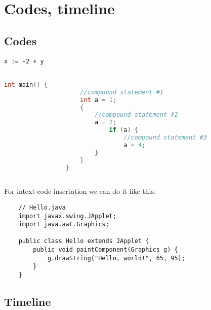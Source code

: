 \chapter{Codes, timeline} \label{chap-4}

\section{Codes}

\begin{lstlisting}[caption={My Captions},captionpos=b]
    x := -2 + y
    
    \end{lstlisting}
   
\begin{lstlisting}[language=C,caption={[short caption]caption text}, captionpos=b]
                 int main() {
                     //compound statement #1 
                     int a = 1;
                     {       
                         //compound statement #2
                         a = 2;
                             if (a) {
                                 //compound statement #3
                                 a = 4;
                         }
                     }
                 }
        
        \end{lstlisting}

\pagebreak
For intext code insertation we can do it like this.
\begin{verbatim}
    // Hello.java
    import javax.swing.JApplet;
    import java.awt.Graphics;

    public class Hello extends JApplet {
        public void paintComponent(Graphics g) {
            g.drawString("Hello, world!", 65, 95);
        }    
    }

    \end{verbatim}

\pagebreak
\section{Timeline}

